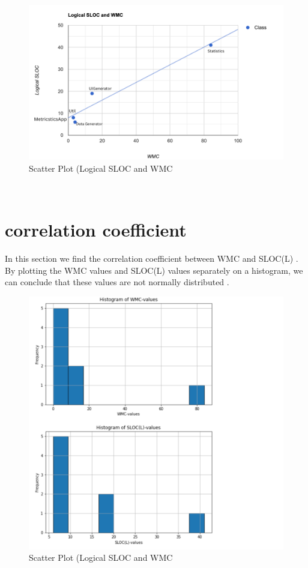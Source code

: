 \documentclass[12pt,letterpaper]{report}
\begin{document}
\begin{figure}
    \begin{center}
    \includegraphics[width=1\linewidth]{scatterPlot.png}
    \end{center}
       \caption{Scatter Plot (Logical SLOC and WMC\label{Scatter Plot (Logical SLOC and WMC}}
\end{figure}


\\

\section{correlation coefficient}
In this section we find the correlation coefficient between WMC and SLOC(L) . By plotting the WMC values and SLOC(L) values separately on a histogram, we can conclude that these values are not normally distributed .\\
\begin{figure}
    \begin{center}
    \includegraphics[width=1\linewidth]{Histo.png}
    \end{center}
       \caption{Scatter Plot (Logical SLOC and WMC\label{Scatter Plot (Logical SLOC and WMC}}
\end{figure}
\end{document}
